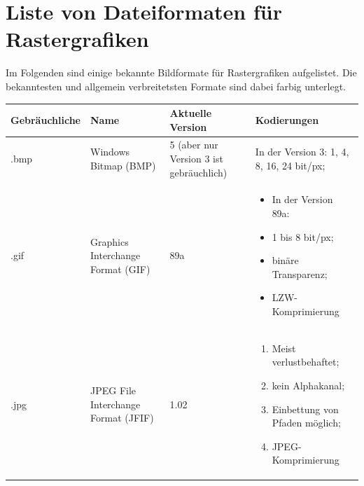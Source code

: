 \section{Liste von Dateiformaten für Rastergrafiken}
\label{sec:liste_von_dateiformaten_für_rastergrafiken}
Im Folgenden sind einige bekannte Bildformate für Rastergrafiken aufgelistet. Die bekanntesten und allgemein verbreitetsten Formate sind dabei farbig unterlegt.

\begin{center}
    \label{tab:dateiformat_rastergrafikken}
    \begin{tabular}{ | l | p{3cm} | p{3cm} | p{5cm} |}
    \hline
    Gebräuchliche & Name & Aktuelle Version & Kodierungen \\ \hline
    .bmp & Windows Bitmap (BMP) & 5 (aber nur Version 3 ist gebräuchlich) & In der Version 3: 1, 4, 8, 16, 24 bit/px; \\ \hline
    .gif & Graphics Interchange Format (GIF) & 89a & 
    
	\begin{itemize}[noitemsep]
	\item In der Version 89a:
	\item 1 bis 8 bit/px;
	\item binäre Transparenz;
	\item LZW-Komprimierung
	\end{itemize}
    \\ \hline
     
    .jpg & JPEG File Interchange Format (JFIF) & 	1.02 &
    \begin{enumerate}[noitemsep]
	\item Meist verlustbehaftet;
	\item kein Alphakanal;
	\item Einbettung von Pfaden möglich;
	\item JPEG-Komprimierung
	\end{enumerate}
    \\ \hline 
    \end{tabular}
\end{center}
